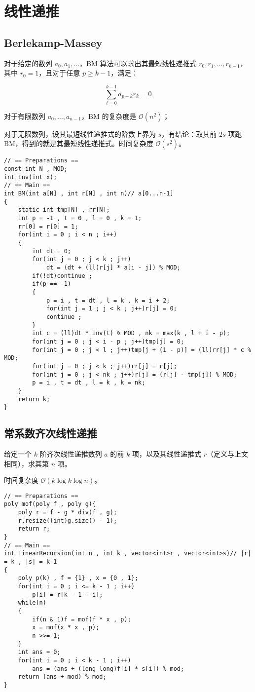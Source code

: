 \section{线性递推}

\subsection{Berlekamp-Massey}

对于给定的数列 $a_0,a_1,\dots$，BM 算法可以求出其最短线性递推式 $r_{0},r_{1},\dots,r_{k-1}$，其中 $r_0=1$，且对于任意 $p\ge k-1$，满足：

$$
\sum\limits_{i=0}^{k-1} a_{p-k}r_{k} = 0
$$

对于有限数列 $a_0,\dots,a_{n-1}$，BM 的复杂度是 $\mathcal{O}(n^2)$；

对于无限数列，设其最短线性递推式的阶数上界为 $s$，有结论：取其前 $2s$ 项跑 BM，得到的就是其最短线性递推式。时间复杂度 $\mathcal{O}(s^2)$。

\begin{verbatim}
// == Preparations ==
const int N , MOD;
int Inv(int x);
// == Main ==
int BM(int a[N] , int r[N] , int n)// a[0...n-1]
{
	static int tmp[N] , rr[N];
	int p = -1 , t = 0 , l = 0 , k = 1; 
	rr[0] = r[0] = 1;
	for(int i = 0 ; i < n ; i++)
	{
		int dt = 0;
		for(int j = 0 ; j < k ; j++)
			dt = (dt + (ll)r[j] * a[i - j]) % MOD;
		if(!dt)continue ;
		if(p == -1)
		{
			p = i , t = dt , l = k , k = i + 2;
			for(int j = 1 ; j < k ; j++)r[j] = 0;
			continue ;
		}
		int c = (ll)dt * Inv(t) % MOD , nk = max(k , l + i - p);
		for(int j = 0 ; j < i - p ; j++)tmp[j] = 0;
		for(int j = 0 ; j < l ; j++)tmp[j + (i - p)] = (ll)rr[j] * c % MOD;
		for(int j = 0 ; j < k ; j++)rr[j] = r[j];
		for(int j = 0 ; j < nk ; j++)r[j] = (r[j] - tmp[j]) % MOD;
		p = i , t = dt , l = k , k = nk;
	}
	return k;
}
\end{verbatim}

\subsection{常系数齐次线性递推}

给定一个 $k$ 阶齐次线性递推数列 $a$ 的前 $k$ 项，以及其线性递推式 $r$（定义与上文相同），求其第 $n$ 项。

时间复杂度 $\mathcal{O}(k \log k \log n)$。

\begin{verbatim}
// == Preparations ==
poly mof(poly f , poly g){
    poly r = f - g * div(f , g);
    r.resize((int)g.size() - 1);
    return r;
}
// == Main ==
int LinearRecursion(int n , int k , vector<int>r , vector<int>s)// |r| = k , |s| = k-1
{
    poly p(k) , f = {1} , x = {0 , 1};
    for(int i = 0 ; i <= k - 1 ; i++)
        p[i] = r[k - 1 - i];
    while(n)
    {
        if(n & 1)f = mof(f * x , p);
        x = mof(x * x , p);
        n >>= 1;
    }
    int ans = 0;
    for(int i = 0 ; i < k - 1 ; i++)
        ans = (ans + (long long)f[i] * s[i]) % mod;
    return (ans + mod) % mod;
}
\end{verbatim}